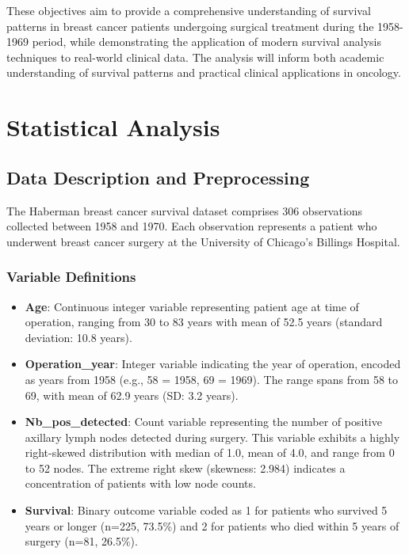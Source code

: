 \documentclass[12pt,a4paper]{article}
\begin{document}
These objectives aim to provide a comprehensive understanding of survival patterns in breast cancer patients undergoing surgical treatment during the 1958-1969 period, while demonstrating the application of modern survival analysis techniques to real-world clinical data. The analysis will inform both academic understanding of survival patterns and practical clinical applications in oncology.

\section{Statistical Analysis}

\subsection{Data Description and Preprocessing}

The Haberman breast cancer survival dataset comprises 306 observations collected between 1958 and 1970. Each observation represents a patient who underwent breast cancer surgery at the University of Chicago's Billings Hospital.

\subsubsection{Variable Definitions}

\begin{itemize}
    \item \textbf{Age}: Continuous integer variable representing patient age at time of operation, ranging from 30 to 83 years with mean of 52.5 years (standard deviation: 10.8 years).
    
    \item \textbf{Operation\_year}: Integer variable indicating the year of operation, encoded as years from 1958 (e.g., 58 = 1958, 69 = 1969). The range spans from 58 to 69, with mean of 62.9 years (SD: 3.2 years).
    
    \item \textbf{Nb\_pos\_detected}: Count variable representing the number of positive axillary lymph nodes detected during surgery. This variable exhibits a highly right-skewed distribution with median of 1.0, mean of 4.0, and range from 0 to 52 nodes. The extreme right skew (skewness: 2.984) indicates a concentration of patients with low node counts.
    
    \item \textbf{Survival}: Binary outcome variable coded as 1 for patients who survived 5 years or longer (n=225, 73.5\%) and 2 for patients who died within 5 years of surgery (n=81, 26.5\%).
\end{itemize}
\end{document}
